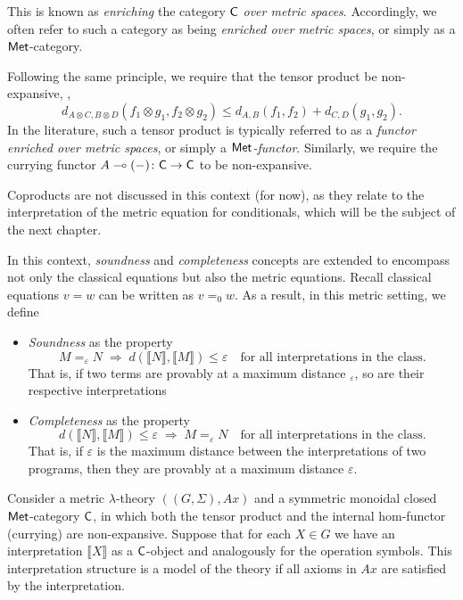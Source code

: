 This is known as \emph{enriching} the category $\mathsf{C}$ \emph{over metric spaces}. Accordingly, we often refer to such a category as being \emph{enriched over metric spaces}, or simply as a $\mathsf{Met}$-category.

Following the same principle, we require that the tensor product be non-expansive, \ie, 
\[
  d_{A \otimes C, B \otimes D}(f_1 \otimes g_1, f_2 \otimes g_2) \leq d_{A,B}(f_1, f_2) + d_{C,D}(g_1, g_2).
\]
In the literature, such a tensor product is typically referred to as a \emph{functor enriched over metric spaces}, or simply a $\mathsf{Met}$\emph{-functor}.
Similarly, we require the currying functor $A \multimap (-) \colon \mathsf{C} \to \mathsf{C}$ to be non-expansive.


Coproducts are not discussed in this context (for now), as they relate to the interpretation of the metric equation for conditionals, which will be the subject of the next chapter.

\vspace{5pt}

In this context, \emph{soundness} and \emph{completeness} concepts are extended to encompass not only the classical equations but also the metric equations. Recall classical equations $v=w$ can be written as $v=_0w$. As a result, in this metric setting, we define 

\begin{itemize}  
  \item \emph{Soundness} as the property 
\[
 M =_{\varepsilon} N \;\Rightarrow\; d (\llbracket N \rrbracket, \llbracket M \rrbracket) \leq \varepsilon
\quad \text{for all interpretations in the class.}
\]
 That is, if two terms are provably at a maximum distance $_{\varepsilon}$, so are their respective interpretations
\item \emph{Completeness} as the property 
\[
 d (\llbracket N \rrbracket, \llbracket M \rrbracket) \leq \varepsilon
\;\Rightarrow\; M =_{\varepsilon} N 
\quad \text{for all interpretations in the class.}
\]
 That is, if ${\varepsilon}$ is the maximum distance between the interpretations of two programs, then they are provably at a maximum distance ${\varepsilon}$.
\end{itemize}


\begin{definition} \label{def:model_metric_no_cond}
 Consider a metric $\lambda$-theory $((G,\Sigma),Ax)$ and a symmetric monoidal closed $\mathsf{Met}$-category $\mathsf{C}$, in which both the tensor product and the internal hom-functor (currying) are non-expansive. Suppose that for each $X \in G$ we have an interpretation $\llbracket X \rrbracket$ as a $\mathsf{C}$-object and analogously for the operation symbols. This interpretation structure is a model of the theory if all axioms in $Ax$ are satisfied by the interpretation.
\end{definition}



